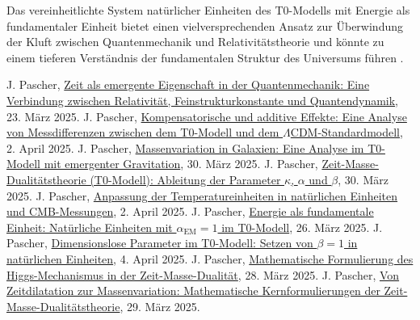 \documentclass[12pt,a4paper]{article}
\newcommand{\alphaEM}{\alpha_{\text{EM}}}
\begin{document}
Das vereinheitlichte System natürlicher Einheiten des T0-Modells mit Energie als fundamentaler Einheit bietet einen vielversprechenden Ansatz zur Überwindung der Kluft zwischen Quantenmechanik und Relativitätstheorie und könnte zu einem tieferen Verständnis der fundamentalen Struktur des Universums führen \cite{pascher_vereinheitlichung_2025}.


\begin{thebibliography}{99}
 J. Pascher, \href{https://github.com/jpascher/T0-Time-Mass-Duality/tree/main/2/pdf/Deutsch/ZeitEmergentQM.pdf}{Zeit als emergente Eigenschaft in der Quantenmechanik: Eine Verbindung zwischen Relativität, Feinstrukturkonstante und Quantendynamik}, 23. März 2025.
 J. Pascher, \href{https://github.com/jpascher/T0-Time-Mass-Duality/tree/main/2/pdf/Deutsch/MessdifferenzenT0Standard.pdf}{Kompensatorische und additive Effekte: Eine Analyse von Messdifferenzen zwischen dem T0-Modell und dem $\Lambda$CDM-Standardmodell}, 2. April 2025.
 J. Pascher, \href{https://github.com/jpascher/T0-Time-Mass-Duality/tree/main/2/pdf/Deutsch/MassVarGalaxien.pdf}{Massenvariation in Galaxien: Eine Analyse im T0-Modell mit emergenter Gravitation}, 30. März 2025.
 J. Pascher, \href{https://github.com/jpascher/T0-Time-Mass-Duality/tree/main/2/pdf/Deutsch/ZeitMasseT0Params.pdf}{Zeit-Masse-Dualitätstheorie (T0-Modell): Ableitung der Parameter $\kappa$, $\alpha$ und $\beta$}, 30. März 2025.
 J. Pascher, \href{https://github.com/jpascher/T0-Time-Mass-Duality/tree/main/2/pdf/Deutsch/NatEinheitenAlpha1.pdf}{Anpassung der Temperatureinheiten in natürlichen Einheiten und CMB-Messungen}, 2. April 2025.
 J. Pascher, \href{https://github.com/jpascher/T0-Time-Mass-Duality/tree/main/2/pdf/Deutsch/NatEinheitenAlpha1.pdf}{Energie als fundamentale Einheit: Natürliche Einheiten mit $\alphaEM = 1$ im T0-Modell}, 26. März 2025.
 J. Pascher, \href{https://github.com/jpascher/T0-Time-Mass-Duality/tree/main/2/pdf/Deutsch/Alpha1Beta1Konsistenz.pdf}{Dimensionslose Parameter im T0-Modell: Setzen von $\beta = 1$ in natürlichen Einheiten}, 4. April 2025.
 J. Pascher, \href{https://github.com/jpascher/T0-Time-Mass-Duality/tree/main/2/pdf/Deutsch/MathHiggsZeitMasse.pdf}{Mathematische Formulierung des Higgs-Mechanismus in der Zeit-Masse-Dualität}, 28. März 2025.
 J. Pascher, \href{https://github.com/jpascher/T0-Time-Mass-Duality/tree/main/2/pdf/Deutsch/MathZeitMasseLagrange.pdf}{Von Zeitdilatation zur Massenvariation: Mathematische Kernformulierungen der Zeit-Masse-Dualitätstheorie}, 29. März 2025.

\end{thebibliography}
\end{document}
